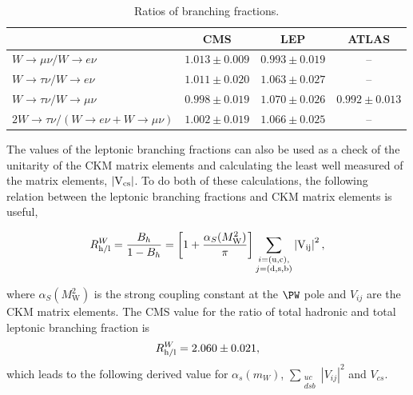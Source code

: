 \begin{table}[htb!]
    \centering
    \caption{Ratios of branching fractions.}
    \label{tab:analysis:result:ratios}
    \begin{tabular}{l|ccc}
                                                                                               & CMS               & LEP               & ATLAS              \\
    \hline                                                                 
    $W\rightarrow \mu\nu / W\rightarrow e\nu$                                                  & $1.013 \pm 0.009$ & $0.993 \pm 0.019$ & --                 \\
    $W\rightarrow \tau\nu / W\rightarrow e\nu$                                                 & $1.011 \pm 0.020$ & $1.063 \pm 0.027$ & --                 \\
    $W\rightarrow \tau\nu / W\rightarrow \mu\nu$                                               & $0.998 \pm 0.019$ & $1.070 \pm 0.026$ & $0.992 \pm 0.013$  \\
    $2 W \rightarrow \tau\nu /(W\rightarrow e\nu + W\rightarrow \mu\nu)$                       & $1.002 \pm 0.019$ & $1.066 \pm 0.025$ & --                 \\
    \end{tabular}
\end{table}

The values of the leptonic branching fractions can also be used as a
check of the unitarity of the CKM matrix elements and calculating the
least well measured of the matrix elements, $\left|\rm V_{cs}\right|$.
To do both of these calculations, the following relation between the
leptonic branching fractions and CKM matrix elements is useful, 

\begin{equation}
    R^W_{\rm h/l} = \frac{B_h}{1-B_h} = 
    \left[1 + \frac{\alpha_{S}(M^{2}_{\mathrm{W}})}{\pi}\right]
    \sum_{\substack{i = (\mathrm{u,c}), \\ j=(\mathrm{d, s,
    b})}}\left|\rm V_{ij}\right|^{2},
\end{equation}

\noindent where $\alpha_{S}(M^{2}_{\mathrm{W}})$ is the strong coupling constant
at the $\PW$ pole and $V_{ij}$ are the CKM matrix elements. The CMS value for
the ratio of total hadronic and total leptonic branching fraction is 
\begin{equation}
    R^W_{\rm h/l} = 2.060\pm0.021,
\end{equation}
\noindent which leads to the following derived value for $\alpha_s(m_W)$, $\sum_{\substack{uc\\dsb}} |V_{ij}|^2$ and $V_{cs}$.


